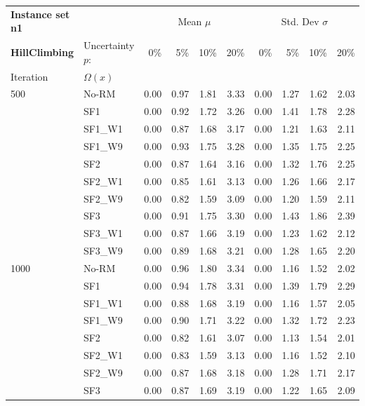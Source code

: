 \newpage

{\fontsize{10}{11} \selectfont
\begin{longtable}{ll|rrrr|rrrr}
\toprule
\textbf{Instance set n1}                 & {} & \multicolumn{4}{c|}{Mean $\mu$} & \multicolumn{4}{c}{Std. Dev $\sigma$} \\
\textbf{HillClimbing}                 & Uncertainty $p$: & 0\% & 5\% & 10\% & 20\% & 0\% & 5\% & 10\% & 20\% \\
Iteration & $\Omega(x)$ &      &      &      &      &      &      &      &      \\
\midrule
500  & No-RM & 0.00 & 0.97 & 1.81 & 3.33 & 0.00 & 1.27 & 1.62 & 2.03 \\
     & SF1 & 0.00 & 0.92 & 1.72 & 3.26 & 0.00 & 1.41 & 1.78 & 2.28 \\
     & SF1\_W1 & 0.00 & 0.87 & 1.68 & 3.17 & 0.00 & 1.21 & 1.63 & 2.11 \\
     & SF1\_W9 & 0.00 & 0.93 & 1.75 & 3.28 & 0.00 & 1.35 & 1.75 & 2.25 \\
     & SF2 & 0.00 & 0.87 & 1.64 & 3.16 & 0.00 & 1.32 & 1.76 & 2.25 \\
     & SF2\_W1 & 0.00 & 0.85 & 1.61 & 3.13 & 0.00 & 1.26 & 1.66 & 2.17 \\
     & SF2\_W9 & 0.00 & 0.82 & 1.59 & 3.09 & 0.00 & 1.20 & 1.59 & 2.11 \\
     & SF3 & 0.00 & 0.91 & 1.75 & 3.30 & 0.00 & 1.43 & 1.86 & 2.39 \\
     & SF3\_W1 & 0.00 & 0.87 & 1.66 & 3.19 & 0.00 & 1.23 & 1.62 & 2.12 \\
     & SF3\_W9 & 0.00 & 0.89 & 1.68 & 3.21 & 0.00 & 1.28 & 1.65 & 2.20 \\ \hline
1000 & No-RM & 0.00 & 0.96 & 1.80 & 3.34 & 0.00 & 1.16 & 1.52 & 2.02 \\
     & SF1 & 0.00 & 0.94 & 1.78 & 3.31 & 0.00 & 1.39 & 1.79 & 2.29 \\
     & SF1\_W1 & 0.00 & 0.88 & 1.68 & 3.19 & 0.00 & 1.16 & 1.57 & 2.05 \\
     & SF1\_W9 & 0.00 & 0.90 & 1.71 & 3.22 & 0.00 & 1.32 & 1.72 & 2.23 \\
     & SF2 & 0.00 & 0.82 & 1.61 & 3.07 & 0.00 & 1.13 & 1.54 & 2.01 \\
     & SF2\_W1 & 0.00 & 0.83 & 1.59 & 3.13 & 0.00 & 1.16 & 1.52 & 2.10 \\
     & SF2\_W9 & 0.00 & 0.87 & 1.68 & 3.18 & 0.00 & 1.28 & 1.71 & 2.17 \\
     & SF3 & 0.00 & 0.87 & 1.69 & 3.19 & 0.00 & 1.22 & 1.65 & 2.09 \\

\end{longtable}}
